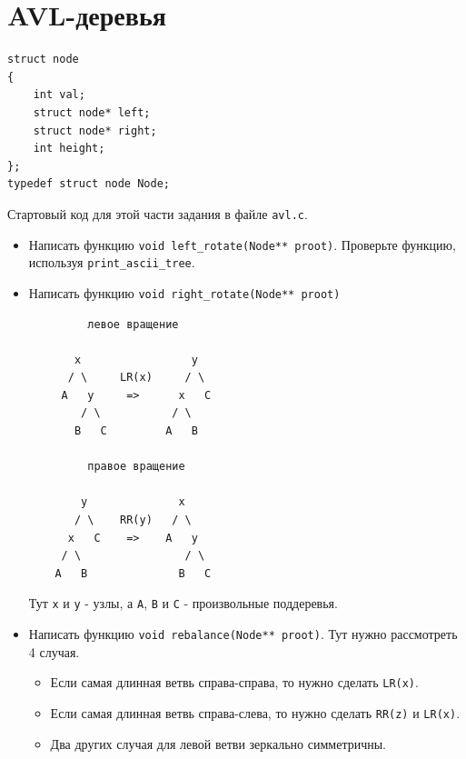 \documentclass{article}
\begin{document}
\section*{AVL-деревья}
\begin{lstlisting}
struct node
{
	int val;
	struct node* left;
	struct node* right;
	int height;
};
typedef struct node Node;
\end{lstlisting}
Стартовый код для этой части задания в файле \texttt{avl.c}.
\begin{itemize}
\item Написать функцию \texttt{void left\_rotate(Node** proot)}. Проверьте функцию, используя \texttt{print\_ascii\_tree}.
\item Написать функцию \texttt{void right\_rotate(Node** proot)}
\begin{multicols}{2}
\noindent
\begin{lstlisting}
         левое вращение

       x                 y     
      / \     LR(x)     / \     
     A   y     =>      x   C    
        / \           / \       
       B   C         A   B      

         правое вращение
   
        y              x 
       / \    RR(y)   / \
      x   C    =>    A   y
     / \                / \
    A   B              B   C
\end{lstlisting}
\end{multicols}
Тут \texttt{x} и \texttt{y} - узлы, а \texttt{A}, \texttt{B} и \texttt{С} - произвольные поддеревья.
\item Написать функцию \texttt{void rebalance(Node** proot)}. Тут нужно рассмотреть 4 случая. 
\begin{itemize}
\item Если самая длинная ветвь справа-справа, то нужно сделать \texttt{LR(x)}.
\item Если самая длинная ветвь справа-слева, то нужно сделать \texttt{RR(z)} и \texttt{LR(x)}.
\item Два других случая для левой ветви зеркально симметричны.
\end{itemize}
\begin{lstlisting}
       

\end{lstlisting}
\end{itemize}
\end{document}
